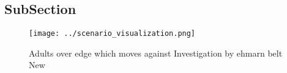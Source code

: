 \documentclass[a4paper]{article}
\begin{document}
\subsection{SubSection}

\begin{figure}
\centering
\texttt{[image: ../scenario\_visualization.png]}
\caption{Adults over edge which moves against Investigation by ehmarn belt New
}
\end{figure}
 
\end{document}
